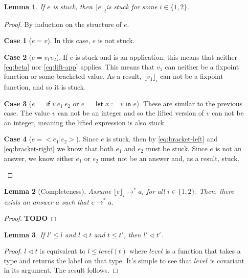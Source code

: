\documentclass[a4paper]{article}
\newcommand{\guards}[0]{\lhd}
\newcommand{\lift}[1]{\lfloor #1 \rfloor}
\theoremstyle{plain}
\newtheorem{lemma}{Lemma}
\theoremstyle{definition}
\newtheorem*{case}{Case}
\begin{document}
\begin{lemma}
  \label{lem:stuck_bracket}
  If $e$ is stuck, then $\lift{e}_i$is stuck for some $i \in \{1, 2\}$.
\end{lemma}
\begin{proof}
  By induction on the structure of $e$.

  \begin{case}[$e = v$]
    In this case, $e$ is not stuck.
  \end{case}

  \begin{case}[$e = v_1 v_2$]
    If $e$ is stuck and is an application, this means that neither
    \ref{eq:beta} nor \ref{eq:lift-app} applies.  This means that $v_1$ can
    neither be a fixpoint function or some bracketed value.  As a result,
    $\lift{v_1}_i$ can not be a fixpoint function, and so it is stuck.
  \end{case}

  \begin{case}[$e = \textsf{ if } v \: e_1 \: e_2$ or $e =
    \textsf{ let } x := v \textsf{ in } e$]
    These are similar to the previous case.  The value $v$ can not be an integer
    and so the lifted version of $v$ can not be an integer, meaning the lifted
    expression is also stuck.
  \end{case}

  \begin{case}[$e = < e_1 | e_2 >$]
    Since $e$ is stuck, then by \ref{eq:bracket-left} and \ref{eq:bracket-right}
    we know that both $e_1$ and $e_2$ must be stuck.  Since $e$ is not an
    answer, we know either $e_1$ or $e_2$ must not be an answer and, as a
    result, stuck.
  \end{case}
\end{proof}

\begin{lemma}[Completeness]
  \label{lem:completeness}
  Assume $\lift{e}_i \to^* a_i$ for all $i \in \{1, 2\}$.  Then, there exists an
  answer $a$ such that $e \to^* a$.
\end{lemma}
\begin{proof}
  \textbf{TODO}
\end{proof}

\begin{lemma}
  \label{lem:guard_subtype}
  If $l' \leq l$ and $l \guards t$ and $t \leq t'$, then $l' \guards t'$.
\end{lemma}
\begin{proof}
  $l \guards t$ is equivalent to $l \leq level(t)$ where $level$ is a function
  that takes a type and returns the label on that type.  It's simple to see that
  $level$ is covariant in its argument.  The result follows.
\end{proof}
\end{document}
